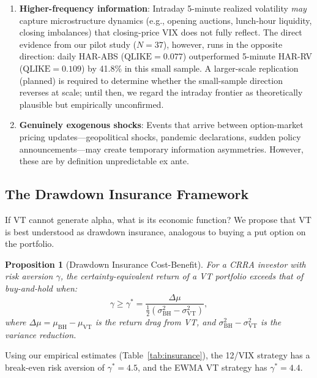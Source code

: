 \documentclass[12pt,a4paper]{article}
\newtheorem{proposition}{Proposition}
\begin{document}
\begin{enumerate}
    \item \textbf{Higher-frequency information}: Intraday 5-minute realized volatility \emph{may} capture microstructure dynamics (e.g., opening auctions, lunch-hour liquidity, closing imbalances) that closing-price VIX does not fully reflect. The direct evidence from our pilot study ($N = 37$), however, runs in the opposite direction: daily HAR-ABS ($\text{QLIKE} = 0.077$) outperformed 5-minute HAR-RV ($\text{QLIKE} = 0.109$) by 41.8\% in this small sample. A larger-scale replication (planned) is required to determine whether the small-sample direction reverses at scale; until then, we regard the intraday frontier as theoretically plausible but empirically unconfirmed.

    \item \textbf{Genuinely exogenous shocks}: Events that arrive between option-market pricing updates---geopolitical shocks, pandemic declarations, sudden policy announcements---may create temporary information asymmetries. However, these are by definition unpredictable ex ante.
\end{enumerate}

\subsection{The Drawdown Insurance Framework}

If VT cannot generate alpha, what is its economic function? We propose that VT is best understood as drawdown insurance, analogous to buying a put option on the portfolio.

\begin{proposition}[Drawdown Insurance Cost-Benefit]
\label{prop:insurance}
For a CRRA investor with risk aversion $\gamma$, the certainty-equivalent return of a VT portfolio exceeds that of buy-and-hold when:
\begin{equation}
\gamma \geq \gamma^* = \frac{\Delta \mu}{\frac{1}{2}(\sigma_{\text{BH}}^2 - \sigma_{\text{VT}}^2)},
\label{eq:gamma_star}
\end{equation}
where $\Delta \mu = \mu_{\text{BH}} - \mu_{\text{VT}}$ is the return drag from VT, and $\sigma_{\text{BH}}^2 - \sigma_{\text{VT}}^2$ is the variance reduction.
\end{proposition}

Using our empirical estimates (Table~\ref{tab:insurance}), the 12/VIX strategy has a break-even risk aversion of $\gamma^* = 4.5$, and the EWMA VT strategy has $\gamma^* = 4.4$.
\end{document}
